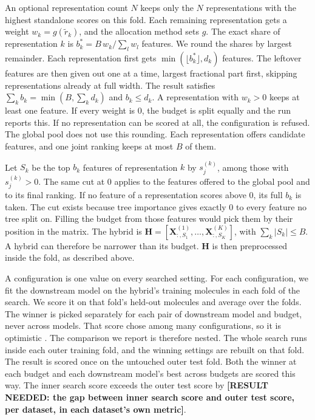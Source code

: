 An optional representation count $N$ keeps only the $N$ representations with the highest standalone scores on this fold. Each remaining representation gets a weight $w_k = g(\tilde r_k)$, and the allocation method sets $g$. The exact share of representation $k$ is $b^*_k = B\, w_k / \sum_l w_l$ features. We round the shares by largest remainder. Each representation first gets $\min(\lfloor b^*_k \rfloor, d_k)$ features. The leftover features are then given out one at a time, largest fractional part first, skipping representations already at full width. The result satisfies $\sum_k b_k = \min(B, \sum_k d_k)$ and $b_k \le d_k$. A representation with $w_k > 0$ keeps at least one feature. If every weight is 0, the budget is split equally and the run reports this. If no representation can be scored at all, the configuration is refused. The global pool does not use this rounding. Each representation offers candidate features, and one joint ranking keeps at most $B$ of them.

Let $S_k$ be the top $b_k$ features of representation $k$ by $s^{(k)}_j$, among those with $s^{(k)}_j > 0$. The same cut at 0 applies to the features offered to the global pool and to its final ranking. If no feature of a representation scores above 0, its full $b_k$ is taken. The cut exists because tree importance gives exactly 0 to every feature no tree split on. Filling the budget from those features would pick them by their position in the matrix. The hybrid is $\mathbf{H} = [\mathbf{X}^{(1)}_{:,S_1}, \dots, \mathbf{X}^{(K)}_{:,S_K}]$, with $\sum_k |S_k| \le B$. A hybrid can therefore be narrower than its budget. $\mathbf{H}$ is then preprocessed inside the fold, as described above.

A configuration is one value on every searched setting. For each configuration, we fit the downstream model on the hybrid's training molecules in each fold of the search. We score it on that fold's held-out molecules and average over the folds. The winner is picked separately for each pair of downstream model and budget, never across models. That score chose among many configurations, so it is optimistic \citep{Varma2006, Cawley2010}. The comparison we report is therefore nested. The whole search runs inside each outer training fold, and the winning settings are rebuilt on that fold. The result is scored once on the untouched outer test fold. Both the winner at each budget and each downstream model's best across budgets are scored this way. The inner search score exceeds the outer test score by \textbf{[RESULT NEEDED: the gap between inner search score and outer test score, per dataset, in each dataset's own metric]}.

